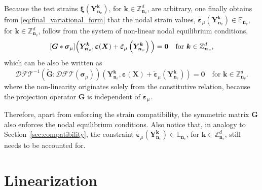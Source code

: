 Because the test strains \(\bm \xi(\bm Y_{\bm n_v}^{\bm k})\), for \(\bm k\in \mathbb Z^{d}_{\bm n_v}\), are arbitrary, one finally obtains from \eqref{eq:final_variational_form} that the nodal strain values, \(\tilde{\bm\varepsilon}_\mu(\bm Y_{\bm n_v}^{\bm k}) \in \mathbb{E}_{\bm n_v}\), for \(\bm k\in \mathbb Z^{d}_{\bm n_v}\), follow from the system of non-linear nodal equilibrium conditions,
\begin{equation} \label{eq:final_form_sum}
[\bm G * \bm\sigma_\mu]\Big(\bm Y_{\bm n_v}^{\bm k}, \bm \varepsilon(\bm X)+\tilde{\bm \varepsilon}_\mu \left(\bm Y_{\bm n_v}^{\bm  k}\right)\Big)=\bm 0\quad \text{for \( \bm k \in \mathbb Z^d_{\bm n_v}\)},
\end{equation}
which can be also be written as
\begin{equation} \label{eq:non_linear_equilibrium_equations}
\mathcal{DFT}^{-1}\left(\tilde{\bm G}:\mathcal{DFT}\left(\bm \sigma_\mu\right)\right)\left(\bm{Y}_{\bm n_v}^{\bm  k}, \bm \varepsilon(\bm X)+\tilde{\bm \varepsilon}_\mu \left(\bm Y_{\bm n_v}^{\bm  k}\right)\right)= \bm 0\quad \text{for \(\bm k \in \mathbb Z^d_{\bm n_v}\)}.
\end{equation}
where the non-linearity originates solely from the constitutive relation, because the projection operator \(\bm G\) is independent of \(\tilde{\bm\varepsilon}_\mu\).

Therefore, apart from enforcing the strain compatibility, the symmetric matrix \(\bm G\) also enforces the nodal equilibrium conditions.
Also notice that, in analogy to Section~\ref{sec:compatibility}, the constraint \(\tilde{\bm\varepsilon}_\mu(\bm Y_{\bm n_v}^{\bm k}) \in \mathbb{E}_{\bm n_v}\), for \(\bm k\in \mathbb Z^{d}_{\bm n_v}\), still needs to be accounted for.

\section{Linearization} \label{sec:linearization}

